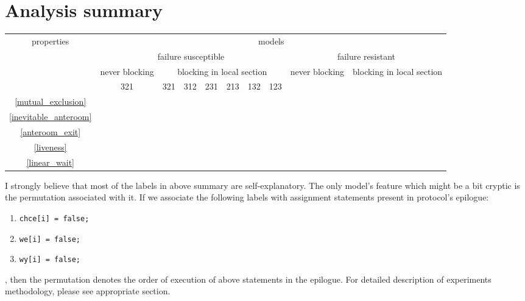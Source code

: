 

\usepackage{multirow}
\usepackage{pifont}
\newcommand{\cmark}{\ding{51}}
\newcommand{\xmark}{\ding{55}}

\newcommand{\eventually}{\, \operatorname{\lozenge} \,}
\newcommand{\always}{\, \operatorname{\square} \,}
\newcommand{\until}{\, \operatorname{\mathcal{U}} \,}




\section{Analysis summary}

\begin{center}
\begin{tabular}{|c|c|c|c|c|c|c|c|c|c|}
\hline
\multirow{4}{*}{properties}     & \multicolumn{9}{|c|}{models} \\
                                & \multicolumn{7}{|c|}{failure susceptible} & \multicolumn{2}{|c|}{failure resistant} \\
                                & never blocking & \multicolumn{6}{|c|}{blocking in local section} & never blocking & blocking in local section \\
                                & 321 & 321 & 312 & 231 & 213 & 132 & 123 &  &  \\
\hline
\ref{mutual_exclusion}          &  &  &  &  &  &  &  &  & \\
\hline
\ref{inevitable_anteroom}       &  &  &  &  &  &  &  &  & \\
\hline
 \ref{anteroom_exit}            &  &  &  &  &  &  &  &  & \\
\hline
 \ref{liveness}                 &  &  &  &  &  &  &  &  & \\
\hline
 \ref{linear_wait}              &  &  &  &  &  &  &  &  & \\
\hline
\end{tabular}
\end{center}

I strongly believe that most of the labels in above summary are self-explanatory.
The only model's feature which might be a bit cryptic is the permutation associated with it.
If we associate the following labels with assignment statements present in protocol's epilogue:
\begin{enumerate}
    \item \verb+chce[i] = false;+
    \item \verb+we[i] = false;+
    \item \verb+wy[i] = false;+
\end{enumerate}
, then the permutation denotes the order of execution of above statements in the epilogue.
For detailed description of experiments methodology, please see appropriate section.


